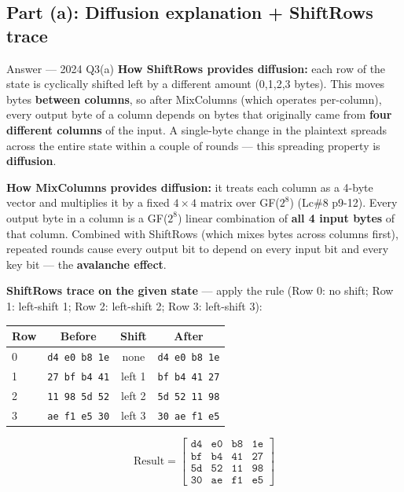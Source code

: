 \documentclass[12pt,a4paper]{article}
\begin{document}
\subsection{Part (a): Diffusion explanation + ShiftRows trace}
\begin{solbox}{Answer --- 2024 Q3(a)}
\textbf{How ShiftRows provides diffusion:} each row of the state is cyclically shifted left by a different amount (0,1,2,3 bytes). This moves bytes \textbf{between columns}, so after MixColumns (which operates per-column), every output byte of a column depends on bytes that originally came from \textbf{four different columns} of the input. A single-byte change in the plaintext spreads across the entire state within a couple of rounds --- this spreading property is \textbf{diffusion}.

\textbf{How MixColumns provides diffusion:} it treats each column as a 4-byte vector and multiplies it by a fixed $4\times4$ matrix over GF($2^8$) (Lc\#8 p9-12). Every output byte in a column is a GF($2^8$) linear combination of \textbf{all 4 input bytes} of that column. Combined with ShiftRows (which mixes bytes across columns first), repeated rounds cause every output bit to depend on every input bit and every key bit --- the \textbf{avalanche effect}.

\textbf{ShiftRows trace on the given state} --- apply the rule (Row 0: no shift; Row 1: left-shift 1; Row 2: left-shift 2; Row 3: left-shift 3):

\renewcommand{\arraystretch}{1.2}
\begin{center}
\begin{tabular}{lcccc}
\toprule
Row & Before & Shift & \multicolumn{2}{c}{After} \\
\midrule
0 & \texttt{d4 e0 b8 1e} & none & \multicolumn{2}{c}{\texttt{d4 e0 b8 1e}} \\
1 & \texttt{27 bf b4 41} & left 1 & \multicolumn{2}{c}{\texttt{bf b4 41 27}} \\
2 & \texttt{11 98 5d 52} & left 2 & \multicolumn{2}{c}{\texttt{5d 52 11 98}} \\
3 & \texttt{ae f1 e5 30} & left 3 & \multicolumn{2}{c}{\texttt{30 ae f1 e5}} \\
\bottomrule
\end{tabular}
\end{center}

\[
\text{Result}=
\begin{bmatrix}
\texttt{d4} & \texttt{e0} & \texttt{b8} & \texttt{1e}\\
\texttt{bf} & \texttt{b4} & \texttt{41} & \texttt{27}\\
\texttt{5d} & \texttt{52} & \texttt{11} & \texttt{98}\\
\texttt{30} & \texttt{ae} & \texttt{f1} & \texttt{e5}
\end{bmatrix}
\]
\end{solbox}
\end{document}
